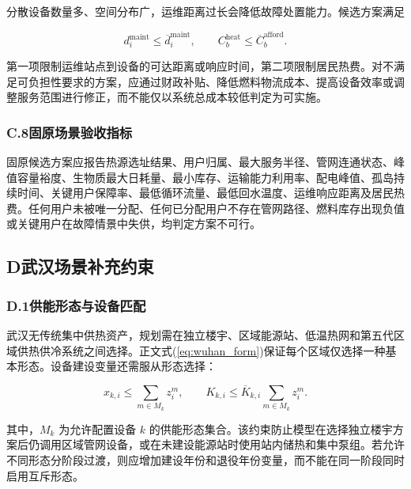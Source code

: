 分散设备数量多、空间分布广，运维距离过长会降低故障处置能力。候选方案满足

\begin{equation}
d_i^{\mathrm{maint}}\leq\overline d_i^{\mathrm{maint}},
\qquad
C_b^{\mathrm{heat}}\leq\overline C_b^{\mathrm{afford}}.
\label{eq:guyuan_maintain_afford}
\end{equation}

第一项限制运维站点到设备的可达距离或响应时间，第二项限制居民热费。对不满足可负担性要求的方案，应通过财政补贴、降低燃料物流成本、提高设备效率或调整服务范围进行修正，而不能仅以系统总成本较低判定为可实施。

\subsubsection*{C.8\quad 固原场景验收指标}

固原候选方案应报告热源选址结果、用户归属、最大服务半径、管网连通状态、峰值容量裕度、生物质最大日耗量、最小库存、运输能力利用率、配电峰值、孤岛持续时间、关键用户保障率、最低循环流量、最低回水温度、运维响应距离及居民热费。任何用户未被唯一分配、任何已分配用户不存在管网路径、燃料库存出现负值或关键用户在故障情景中失供，均判定方案不可行。

\clearpage

\subsection*{D\quad 武汉场景补充约束}
\label{app:wuhan}

\subsubsection*{D.1\quad 供能形态与设备匹配}

武汉无传统集中供热资产，规划需在独立楼宇、区域能源站、低温热网和第五代区域供热供冷系统之间选择。正文式(\ref{eq:wuhan_form})保证每个区域仅选择一种基本形态。设备建设变量还需服从形态选择：

\begin{equation}
x_{k,i}\leq\sum_{m\in M_k}z_i^m,
\qquad
K_{k,i}\leq\overline K_{k,i}\sum_{m\in M_k}z_i^m.
\label{eq:wuhan_equipment_match}
\end{equation}

其中，$M_k$ 为允许配置设备 $k$ 的供能形态集合。该约束防止模型在选择独立楼宇方案后仍调用区域管网设备，或在未建设能源站时使用站内储热和集中泵组。若允许不同形态分阶段过渡，则应增加建设年份和退役年份变量，而不能在同一阶段同时启用互斥形态。

